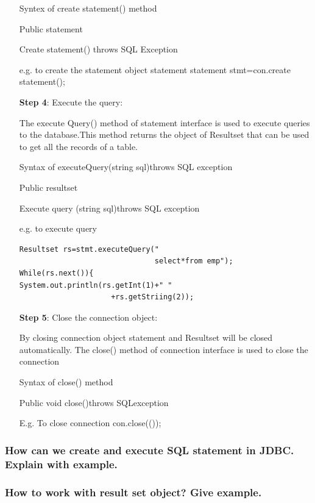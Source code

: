 \documentclass[twocolumn, a4paper]{article}
\begin{document}
\begin{itemize}
    \vskip10pt
    Syntex of create statement() method

    Public statement

    Create statement() throws SQL Exception

    e.g. to create the statement object statement statement stmt=con.create statement();

  \item [\textbf{Step 4}:] Execute the query:

    The execute Query() method of statement interface is used to execute
    queries to the database.This method returns the object of Resultset that
    can be used to get all the records of a table.

    \vskip10pt
    Syntax of executeQuery(string sql)throws SQL exception

    Public resultset

    Execute query (string sql)throws SQL exception

    e.g. to execute query
    \begin{lstlisting}
Resultset rs=stmt.executeQuery("
                               select*from emp");
While(rs.next()){
System.out.println(rs.getInt(1)+" "
                     +rs.getStriing(2));
    \end{lstlisting}
  \item [\textbf{Step 5}:] Close the connection object:

    By closing connection object statement and Resultset will be closed
    automatically. The close() method of connection interface is used to close
    the connection

    \vskip10pt
    Syntax of close() method

    Public void close()throws SQLexception

    E.g. To close connection con.close(());
\end{itemize}

\subsubsection{How can we create and execute SQL statement in JDBC. Explain
with example.}
\subsubsection{How to work with result set object? Give example.}
\end{document}
